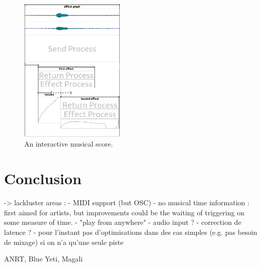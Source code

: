 \documentclass{article}
\begin{document}
\begin{figure}[h]
    \centering
    \includegraphics[width=0.45\textwidth]{figures/ex3.png}
    \caption{An interactive musical score.}
    \label{fig.score3}
\end{figure}

\section{Conclusion}
-> lackluster areas : 
- MIDI support (but OSC)
- no musical time information : first aimed for artists, 
but improvements could be the waiting of triggering on some measure of time.
- "play from anywhere"
- audio input ?
- correction de latence ?
- pour l'instant pas d'optimisations dans des cas simples (e.g. pas besoin de mixage) si on n'a qu'une seule piste
\begin{acknowledgments}
    ANRT, Blue Yeti, Magali
\end{acknowledgments} 


\end{document}
